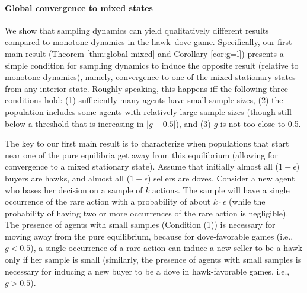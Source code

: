 \documentclass[12pt]{article}
\numberwithin{equation}{section}
\numberwithin{figure}{section}
\theoremstyle{definition}
\theoremstyle{plain}
\theoremstyle{plain}
\theoremstyle{plain}
\theoremstyle{remark}
\theoremstyle{plain}
\theoremstyle{plain}
\def\e{\epsilon}
\begin{document}
\paragraph{Global convergence to mixed states} 
We show that sampling dynamics can yield qualitatively different results compared to monotone dynamics in the hawk--dove game. Specifically, our first main result (Theorem \ref{thm:global-mixed} and Corollary \ref{cor:g=l}) presents a simple 
 condition for sampling dynamics to induce the opposite result (relative to monotone dynamics), namely, convergence to one of the mixed stationary states from any interior state. Roughly speaking, this happens iff the following three conditions hold:
 (1) sufficiently many agents have small sample sizes, (2) 
the population includes some agents with relatively large sample sizes (though still below a threshold that is increasing in $|g-0.5|$), and (3) $g$  is not too close to 0.5. 

The key to our first main result is to characterize when populations that start near one of the pure equilibria get away from this equilibrium (allowing for convergence to a mixed stationary state).
Assume that initially almost all ($1-\e$) buyers are hawks, and almost all ($1-\e$) sellers are doves. Consider a new agent who bases her decision  on a sample of $k$ actions. The sample will have a single occurrence of the rare action with a probability of about $k\cdot \epsilon$ (while the probability of having two or more occurrences of the rare action is negligible). The presence of agents with small samples (Condition (1)) is necessary for moving away from the pure equilibrium, because for dove-favorable games (i.e., $g<0.5$), a single occurrence of a rare action can induce a new seller to be a hawk only if her sample is small 
(similarly, the presence of agents with small samples is necessary for inducing a new buyer to be a dove in hawk-favorable games, i.e., $g>0.5$).
\end{document}
